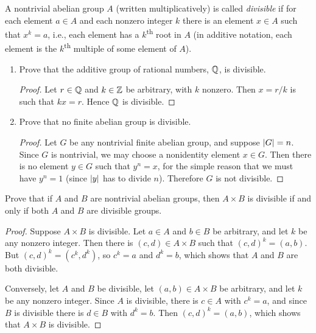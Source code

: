  A nontrivial abelian group $A$ (written
multiplicatively) is called {\em divisible} if for each element
$a\in A$ and each nonzero integer $k$ there is an element $x\in A$
such that $x^k = a$, i.e., each element has a $k$\textsuperscript{th}
root in $A$ (in additive notation, each element is the
$k$\textsuperscript{th} multiple of some element of $A$).
\begin{enumerate}
\item Prove that the additive group of rational numbers, $\mathbb{Q}$, is
  divisible.
  \begin{proof}
    Let $r\in\mathbb{Q}$ and $k\in\mathbb{Z}$ be arbitrary, with $k$ nonzero. Then
    $x = r/k$ is such that $kx = r$. Hence $\mathbb{Q}$ is divisible.
  \end{proof}
\item Prove that no finite abelian group is divisible.
  \begin{proof}
    Let $G$ be any nontrivial finite abelian group, and suppose
    $\lvert{G}\rvert = n$. Since $G$ is nontrivial, we may choose a
    nonidentity element $x\in G$. Then there is no element $y\in G$
    such that $y^n = x$, for the simple reason that we must have
    $y^n = 1$ (since $\lvert{y}\rvert$ has to divide $n$). Therefore $G$ is
    not divisible.
  \end{proof}
\end{enumerate}

 Prove that if $A$ and $B$ are nontrivial abelian groups,
then $A\times B$ is divisible if and only if both $A$ and $B$ are
divisible groups.
\begin{proof}
  Suppose $A\times B$ is divisible. Let $a\in A$ and $b\in B$ be
  arbitrary, and let $k$ be any nonzero integer. Then there is
  $(c,d)\in A\times B$ such that $(c,d)^k = (a,b)$. But
  $(c,d)^k = (c^k,d^k)$, so $c^k = a$ and $d^k = b$, which shows that
  $A$ and $B$ are both divisible.

  Conversely, let $A$ and $B$ be divisible, let $(a,b)\in A\times B$
  be arbitrary, and let $k$ be any nonzero integer. Since $A$ is
  divisible, there is $c\in A$ with $c^k = a$, and since $B$ is
  divisible there is $d\in B$ with $d^k = b$. Then $(c,d)^k = (a,b)$,
  which shows that $A\times B$ is divisible.
\end{proof}
